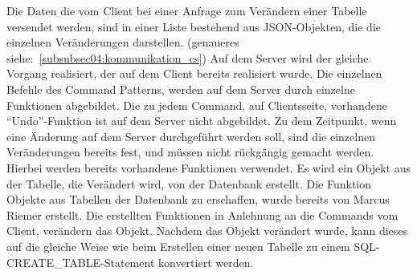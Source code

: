 Die Daten die vom Client bei einer Anfrage zum Verändern einer Tabelle versendet werden, sind in einer Liste bestehend aus JSON-Objekten, die die einzelnen Veränderungen darstellen. (genaueres siehe:~\ref{subsubsec04:kommunikation_cs})
Auf dem Server wird der gleiche Vorgang realisiert, der auf dem Client bereits realisiert wurde. Die einzelnen Befehle des Command Patterns, werden auf dem Server durch einzelne Funktionen abgebildet. Die zu jedem Command, auf Clientsseite, vorhandene ``Undo''-Funktion ist auf dem Server nicht abgebildet. Zu dem Zeitpunkt, wenn eine Änderung auf dem Server durchgeführt werden soll, sind die einzelnen Veränderungen bereits fest, und müssen nicht rückgängig gemacht werden.
Hierbei werden bereits vorhandene Funktionen verwendet. Es wird ein Objekt aus der Tabelle, die Verändert wird, von der Datenbank erstellt. Die Funktion Objekte aus Tabellen der Datenbank zu erschaffen, wurde bereits von Marcus Riemer erstellt. Die erstellten Funktionen in Anlehnung an die Commands vom Client, verändern das Objekt. Nachdem das Objekt verändert wurde, kann dieses auf die gleiche Weise wie beim Erstellen einer neuen Tabelle zu einem SQL-CREATE\_TABLE-Statement konvertiert werden.

